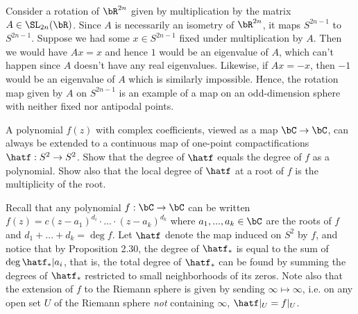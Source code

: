 \begin{homework}[e]
\begin{prf}
    Consider a rotation of $\bR^{2n}$ given by multiplication by the matrix $A \in \SL_{2n}(\bR)$. Since $A$ is necessarily an isometry of $\bR^{2n}$, it maps $S^{2n-1}$ to $S^{2n-1}$. Suppose we had some $x \in S^{2n-1}$ fixed under multiplication by $A$. Then we would have $Ax = x$ and hence $1$ would be an eigenvalue of $A$, which can't happen since $A$ doesn't have any real eigenvalues. Likewise, if $Ax = -x$, then $-1$ would be an eigenvalue of $A$ which is similarly impossible. Hence, the rotation map given by $A$ on $S^{2n-1}$ is an example of a map on an odd-dimension sphere with neither fixed nor antipodal points.
  \end{prf}
   A polynomial $f(z)$ with complex coefficients, viewed as a map $\bC\to \bC$, can always be extended to a continuous map of one-point compactifications $\hatf:S^2 \to S^2$. Show that the degree of $\hatf$ equals the degree of $f$ as a  polynomial. Show also that the local degree of $\hatf$ at a root of $f$ is the multiplicity of the root.
  \begin{prf}
    Recall that any polynomial $f:\bC\to \bC$ can be written $f(z) = c(z - a_1)^{d_i}\cdot ... \cdot (z - a_k)^{d_k}$ where $a_1,...,a_k\in \bC$ are the roots of $f$ and $d_1 + ... + d_k = \deg f$. Let $\hatf$ denote the map induced on $S^2$ by $f$, and notice that by Proposition 2.30, the degree of $\hatf_*$ is equal to the sum of $\deg \hatf_* | a_i$, that is, the total degree of $\hatf_*$ can be found by summing the degrees of $\hatf_*$ restricted to small neighborhoods of its zeros. Note also that the extension of $f$ to the Riemann sphere is given by sending $\infty \mapsto \infty$, i.e. on any open set $U$ of the Riemann sphere \emph{not} containing $\infty$, $\hatf|_U = f|_U$.


\end{prf}
\end{homework}
